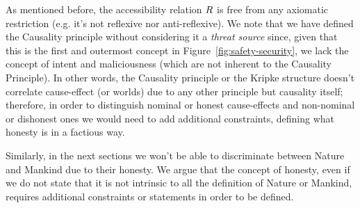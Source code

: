 As mentioned before, the accessibility relation $R$ is free from
any axiomatic restriction (e.g. it's not reflexive nor anti-reflexive).  We
note that we have defined the Causality principle without considering it a
\emph{threat source} since, given that this is the first and outermost concept
in Figure~\ref{fig:safety-security}, we lack the concept of intent and
maliciousness (which are not inherent to the Causality Principle). 
In other words, the Causality principle or the Kripke structure
doesn't correlate cause-effect (or worlds) due to any other principle but
causality itself; therefore, in order to distinguish nominal or honest cause-effects
and non-nominal or dishonest ones we would need to add additional constraints, defining
what honesty is in a factious way.

Similarly, in the next sections we won't be able to discriminate between Nature
and Mankind due to their honesty. We argue that the concept of honesty, even if
we do not state that it is not intrinsic to all the definition of Nature or
Mankind, requires additional constraints or statements in order to be defined.

